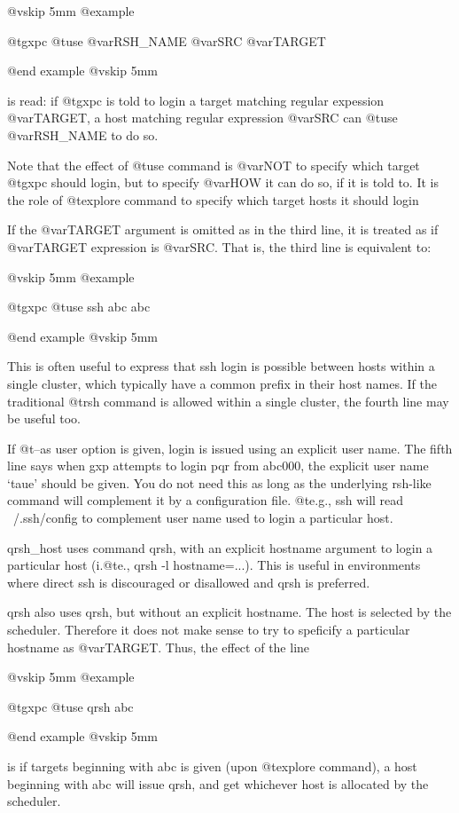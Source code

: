 @vskip 5mm
@example

  @t{gxpc} @t{use} @var{RSH_NAME} @var{SRC} @var{TARGET}

@end example
@vskip 5mm

is read: if @t{gxpc} is told to login a target matching regular
expession @var{TARGET}, a host matching regular expression @var{SRC} can @t{use}
@var{RSH_NAME} to do so.

Note that the effect of @t{use} command is @var{NOT} to specify which target
@t{gxpc} should login, but to specify @var{HOW} it can do so, if it is told
to. It is the role of @t{explore} command to specify which target hosts it
should login

If the @var{TARGET} argument is omitted as in the third line, it is
treated as if @var{TARGET} expression is @var{SRC}. That is, the third line
is equivalent to:

@vskip 5mm
@example

  @t{gxpc} @t{use} ssh abc abc

@end example
@vskip 5mm

This is often useful to express that ssh login is possible
between hosts within a single cluster, which typically have a
common prefix in their host names. If the traditional @t{rsh} command
is allowed within a single cluster, the fourth line may be useful
too.

If @t{--as} user option is given, login is issued using an explicit user
name. The fifth line says when gxp attempts to login pqr from abc000,
the explicit user name `taue' should be given. You do not need this as
long as the underlying rsh-like command will complement it by a
configuration file. @t{e}.g., ssh will read ~/.ssh/config to complement
user name used to login a particular host.

qrsh_host uses command qrsh, with an explicit hostname argument
to login a particular host (i.@t{e}., qrsh -l hostname=...).  This is
useful in environments where direct ssh is discouraged or
disallowed and qrsh is preferred.

qrsh also uses qrsh, but without an explicit hostname. The host
is selected by the scheduler. Therefore it does not make sense to
try to speficify a particular hostname as @var{TARGET}.  Thus, the
effect of the line

@vskip 5mm
@example

  @t{gxpc} @t{use} qrsh abc

@end example
@vskip 5mm

is if targets beginning with abc is given (upon @t{explore} command),
a host beginning with abc will issue qrsh, and get whichever host
is allocated by the scheduler.

